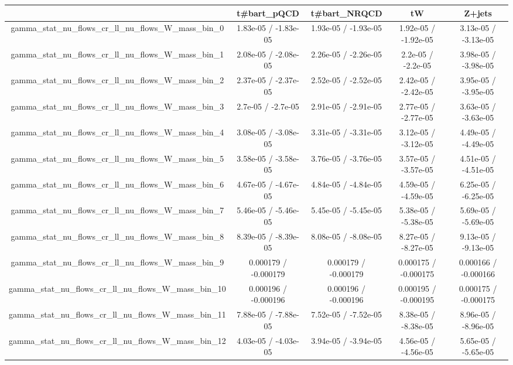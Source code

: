 \documentclass[10pt]{article}
\begin{document}
\begin{table}[htbp]
\begin{center}
\begin{tabular}{|c|c|c|c|c|}
\hline 
      & t#bar{t}_{pQCD}      & t#bar{t}_{NRQCD}      & tW      & Z+jets \\ 
\hline 
  gamma_stat_nu_flows_cr_ll_nu_flows_W_mass_bin_0 & 1.83e-05 / -1.83e-05 & 1.93e-05 / -1.93e-05 & 1.92e-05 / -1.92e-05 & 3.13e-05 / -3.13e-05 \\ 
  gamma_stat_nu_flows_cr_ll_nu_flows_W_mass_bin_1 & 2.08e-05 / -2.08e-05 & 2.26e-05 / -2.26e-05 & 2.2e-05 / -2.2e-05 & 3.98e-05 / -3.98e-05 \\ 
  gamma_stat_nu_flows_cr_ll_nu_flows_W_mass_bin_2 & 2.37e-05 / -2.37e-05 & 2.52e-05 / -2.52e-05 & 2.42e-05 / -2.42e-05 & 3.95e-05 / -3.95e-05 \\ 
  gamma_stat_nu_flows_cr_ll_nu_flows_W_mass_bin_3 & 2.7e-05 / -2.7e-05 & 2.91e-05 / -2.91e-05 & 2.77e-05 / -2.77e-05 & 3.63e-05 / -3.63e-05 \\ 
  gamma_stat_nu_flows_cr_ll_nu_flows_W_mass_bin_4 & 3.08e-05 / -3.08e-05 & 3.31e-05 / -3.31e-05 & 3.12e-05 / -3.12e-05 & 4.49e-05 / -4.49e-05 \\ 
  gamma_stat_nu_flows_cr_ll_nu_flows_W_mass_bin_5 & 3.58e-05 / -3.58e-05 & 3.76e-05 / -3.76e-05 & 3.57e-05 / -3.57e-05 & 4.51e-05 / -4.51e-05 \\ 
  gamma_stat_nu_flows_cr_ll_nu_flows_W_mass_bin_6 & 4.67e-05 / -4.67e-05 & 4.84e-05 / -4.84e-05 & 4.59e-05 / -4.59e-05 & 6.25e-05 / -6.25e-05 \\ 
  gamma_stat_nu_flows_cr_ll_nu_flows_W_mass_bin_7 & 5.46e-05 / -5.46e-05 & 5.45e-05 / -5.45e-05 & 5.38e-05 / -5.38e-05 & 5.69e-05 / -5.69e-05 \\ 
  gamma_stat_nu_flows_cr_ll_nu_flows_W_mass_bin_8 & 8.39e-05 / -8.39e-05 & 8.08e-05 / -8.08e-05 & 8.27e-05 / -8.27e-05 & 9.13e-05 / -9.13e-05 \\ 
  gamma_stat_nu_flows_cr_ll_nu_flows_W_mass_bin_9 & 0.000179 / -0.000179 & 0.000179 / -0.000179 & 0.000175 / -0.000175 & 0.000166 / -0.000166 \\ 
  gamma_stat_nu_flows_cr_ll_nu_flows_W_mass_bin_10 & 0.000196 / -0.000196 & 0.000196 / -0.000196 & 0.000195 / -0.000195 & 0.000175 / -0.000175 \\ 
  gamma_stat_nu_flows_cr_ll_nu_flows_W_mass_bin_11 & 7.88e-05 / -7.88e-05 & 7.52e-05 / -7.52e-05 & 8.38e-05 / -8.38e-05 & 8.96e-05 / -8.96e-05 \\ 
  gamma_stat_nu_flows_cr_ll_nu_flows_W_mass_bin_12 & 4.03e-05 / -4.03e-05 & 3.94e-05 / -3.94e-05 & 4.56e-05 / -4.56e-05 & 5.65e-05 / -5.65e-05 \\ 

\end{tabular}
\end{center}
\end{table}
\end{document}
